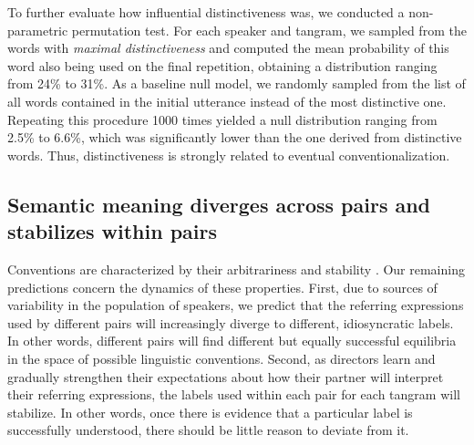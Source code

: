 \documentclass[alpha-refs]{wiley-article}
\begin{document}
To further evaluate how influential distinctiveness was, we conducted a non-parametric permutation test.
For each speaker and tangram, we sampled from the words with \emph{maximal distinctiveness} and computed the mean probability of this word also being used on the final repetition, obtaining a distribution ranging from 24\% to 31\%.
As a baseline null model, we randomly sampled from the list of all words contained in the initial utterance instead of the most distinctive one.
Repeating this procedure 1000 times yielded a null distribution ranging from 2.5\% to 6.6\%, which was significantly lower than the one derived from distinctive words.
Thus, distinctiveness is strongly related to eventual conventionalization.

\subsection{Semantic meaning diverges across pairs and stabilizes within pairs}

Conventions are characterized by their arbitrariness and stability \citep{Lewis69_Convention}.
Our remaining predictions concern the dynamics of these properties.
First, due to sources of variability in the population of speakers, we predict that the referring expressions used by different pairs will increasingly diverge to different, idiosyncratic labels.
In other words, different pairs will find different but equally successful equilibria in the space of possible linguistic conventions.
Second, as directors learn and gradually strengthen their expectations about how their partner will interpret their referring expressions, the labels used within each pair for each tangram will stabilize.
In other words, once there is evidence that a particular label is successfully understood, there should be little reason to deviate from it.
\end{document}
